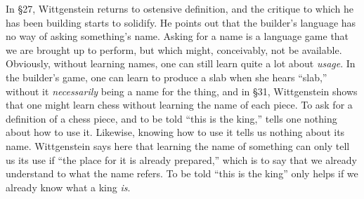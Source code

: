 \documentclass[man,12pt,natbib]{apa6}
\begin{document}
In \S 27, Wittgenstein returns to ostensive definition, and the critique to
which he has been building starts to solidify. He points out that the builder's
language has no way of asking something's name. Asking for a name is a language
game 
that we are brought up to perform, but which might, conceivably, not be
available. 
Obviously, without learning names, one can still learn quite a lot about
\emph{usage}. In the builder's game, one can learn to produce a slab when she
hears ``slab,'' without it \emph{necessarily} being a name for the thing, 
and in \S 31, Wittgenstein shows that one might learn chess without learning
the name of each piece. To ask for a definition of a chess piece, 
and to be told ``this is the king,'' tells one nothing about how to use it.
Likewise, knowing how to use it
tells us nothing about its name. Wittgenstein says here that learning the name
of something can only tell us its use if ``the place for it is already
prepared,'' which is to say that we already understand to what the name refers.
To be told ``this is the king'' only helps if we already know what a king
\emph{is}.
\end{document}
